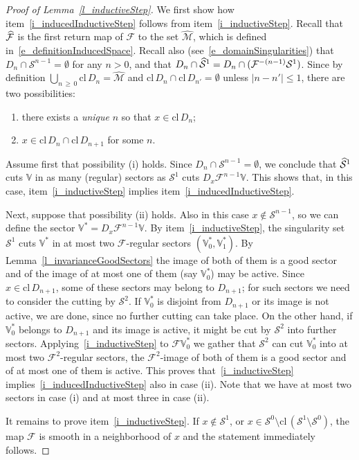 \documentclass[AHL, Unicode, longabstracts,published]{cedram}
\newcommand{\nin}{\not\in}
\newcommand{\cl}[1]{\mathrm{cl}\,#1}
\newcommand{\cm}{\mathcal{F}}
\newcommand{\csp}{\mathcal{M}}
\newcommand{\cmp}{\hat\cm}
\newcommand{\cspi}{\widehat{\csp}}
\newcommand{\singPrivate}{\mathcal{S}}
\newcommand{\sing}[1]{\singPrivate^{#1}}
\newcommand{\singp}[1]{\hat{\singPrivate}^{#1}}
\newcommand{\cV}{\mathbb{V}}
\newcommand{\Dom}{D}
\newcommand*{\relabel}{\renewcommand{\labelenumi}{(\theenumi)}}
\newcommand*{\romanenumi}{\renewcommand*{\theenumi}{\roman{enumi}}\relabel}
\let\oldhat\hat
\renewcommand*{\hat}[1]{\mathchoice{\widehat{#1}}{\widehat{#1}}{\oldhat{#1}}{\oldhat{#1}}}
\begin{document}
\begin{proof}[Proof of Lemma~\ref{l_inductiveStep}]
We first show how item~\eqref{i_inducedInductiveStep} follows from item~\eqref{i_inductiveStep}. Recall that $\cmp$ is the first return map of $\cm$ to the set $\cspi$, which is defined in~\eqref{e_definitionInducedSpace}. Recall also (see~\eqref{e_domainSingularities}) that $\Dom_n\cap\sing{n-1} = \emptyset$ for any $n > 0$, and that $\Dom_n\cap\singp1 = \Dom_n\cap (\cm^{-(n-1)}\sing1)$. Since by definition $\bigcup_{n\,\ge\,0}\cl\Dom_n = \cspi$ and $\cl\Dom_n\cap\cl\Dom_{n'} = \emptyset$ unless $|n-n'|\le 1$, there are two possibilities:
\begin{enumerate}\romanenumi
\item there exists a {\em unique} $n$ so that $x\in \cl\Dom_n$;
\item $x\in\cl\Dom_n\cap\cl\Dom_{n+1}$ for some $n$.
\end{enumerate}
Assume first that possibility (i) holds. Since $\Dom_n\cap\sing{n-1} = \emptyset$, we conclude that $\singp1$ cuts $\cV$ in as many (regular) sectors as $\sing1$ cuts $D_{x}\cm^{n-1}\cV$. This shows that, in this case, item~\eqref{i_inductiveStep} implies item~\eqref{i_inducedInductiveStep}.

Next, suppose that possibility (ii) holds. Also in this case $x\nin\sing{n-1}$, so we can define the sector $\cV^{*} = D_{x}\cm^{n-1}\cV$. By item~\eqref{i_inductiveStep}, the singularity set $\sing1$ cuts $\cV^*$ in at most two $\cm$-regular sectors $(\cV^*_0,\cV^{*}_1)$. By Lemma~\ref{l_invarianceGoodSectors} the image of both of them is a good sector and of the image of at most one of them (say $\cV^{*}_0$) may be active. Since $x\in\cl\Dom_{n+1}$, some of these sectors may belong to $\Dom_{n+1}$; for such sectors we need to consider the cutting by $\sing2$. If $\cV^*_0$ is disjoint from $\Dom_{n+1}$ or its image is not active, we are done, since no further cutting can take place. On the other hand, if $\cV^*_0$ belongs to $\Dom_{n+1}$ and its image is active, it might be cut by $\sing2$ into further sectors. Applying~\eqref{i_inductiveStep} to $\cm\cV^*_0$ we gather that $\sing2$ can cut $\cV^*_0$ into at most two $\cm^2$-regular sectors, the $\cm^2$-image of both of them is a good sector and of at most one of them is active. This proves that~\eqref{i_inductiveStep} implies~\eqref{i_inducedInductiveStep} also in case (ii). Note that we have at most two sectors in case (i) and at most three in case (ii).


It remains to prove item~\eqref{i_inductiveStep}. If $x\not\in\sing1$, or $x\in\sing0\setminus\cl(\sing1\setminus\sing0)$, the map $\cm$ is smooth in a neighborhood of $x$ and the statement immediately follows.


\end{proof}
\end{document}
